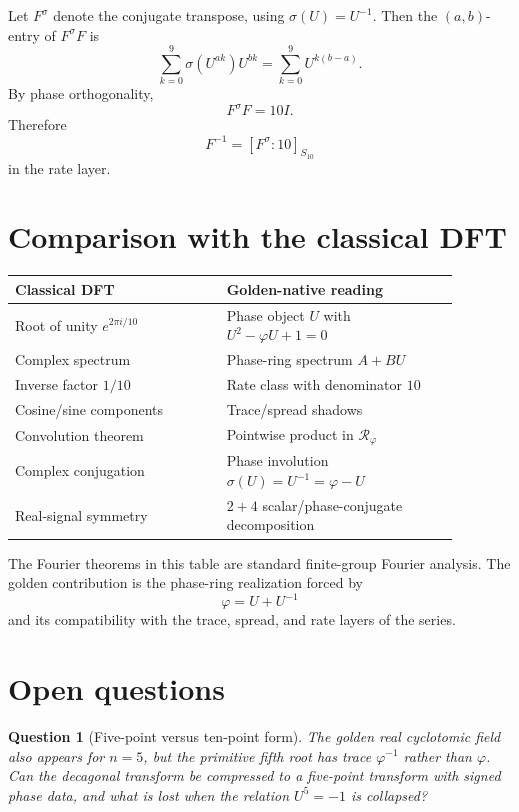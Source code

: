 \documentclass[11pt]{article}
\newtheorem{question}[definition]{Question}
\newcommand{\ph}{\varphi}
\newcommand{\RR}{\mathcal R_\ph}
\newcommand{\sig}{\sigma}
\begin{document}
Let $F^\sig$ denote the conjugate transpose, using $\sig(U)=U^{-1}$.  Then the $(a,b)$-entry of $F^\sig F$ is
\[
    \sum_{k=0}^{9}\sig(U^{ak})U^{bk}
    =\sum_{k=0}^{9}U^{k(b-a)}.
\]
By phase orthogonality,
\[
    F^\sig F=10I.
\]
Therefore
\[
    F^{-1}=\left[F^\sig:10\right]_{S_{10}}
\]
in the rate layer.

\section{Comparison with the classical DFT}

\begin{center}
\small
\begin{tabular}{p{0.42\linewidth}p{0.46\linewidth}}
\toprule
Classical DFT & Golden-native reading \\
\midrule
Root of unity $e^{2\pi i/10}$ & Phase object $U$ with $U^2-\ph U+1=0$ \\
Complex spectrum & Phase-ring spectrum $A+BU$ \\
Inverse factor $1/10$ & Rate class with denominator $10$ \\
Cosine/sine components & Trace/spread shadows \\
Convolution theorem & Pointwise product in $\RR$ \\
Complex conjugation & Phase involution $\sig(U)=U^{-1}=\ph-U$ \\
Real-signal symmetry & $2+4$ scalar/phase-conjugate decomposition \\
\bottomrule
\end{tabular}
\end{center}

The Fourier theorems in this table are standard finite-group Fourier analysis.  The golden contribution is the phase-ring realization forced by
\[
    \ph=U+U^{-1}
\]
and its compatibility with the trace, spread, and rate layers of the series.

\section{Open questions}

\begin{question}[Five-point versus ten-point form]
The golden real cyclotomic field also appears for $n=5$, but the primitive fifth root has trace $\ph^{-1}$ rather than $\ph$.  Can the decagonal transform be compressed to a five-point transform with signed phase data, and what is lost when the relation $U^5=-1$ is collapsed?
\end{question}
\end{document}
